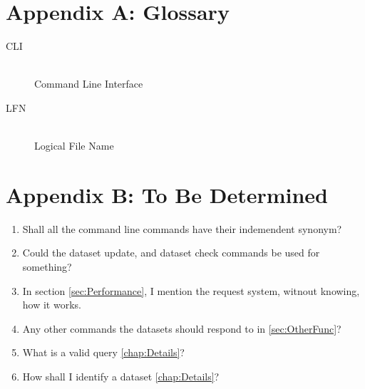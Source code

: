 \documentclass{scrreprt}
\begin{document}
\newpage
\appendix
\chapter*{Appendix A: Glossary} \label{app:AppendixA}
\begin{description}
\item[CLI] \hfill \\
Command Line Interface
\item[LFN] \hfill \\
Logical File Name
\end{description}

\newpage
\appendix
\chapter*{Appendix B: To Be Determined} \label{app:AppendixB}
\begin{enumerate}
\item Shall all the command line commands have their indemendent synonym?
\item Could the dataset update, and dataset check commands be used for something?
\item In section \ref{sec:Performance}, I mention the request system, witnout knowing, how it works.
\item Any other commands the datasets should respond to in \ref{sec:OtherFunc}?
\item What is a valid query \ref{chap:Details}?
\item How shall I identify a dataset \ref{chap:Details}?
\end{enumerate}
\end{document}
